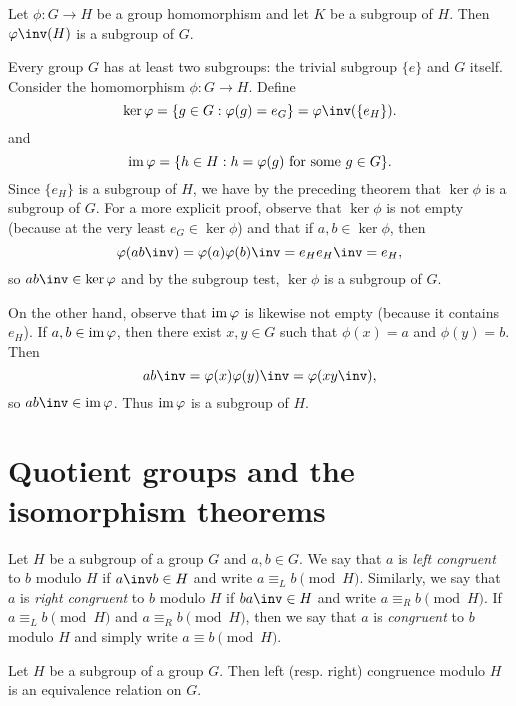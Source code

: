 \begin{theorem}
    Let \(\phi: G \to H\) be a group homomorphism and let \(K\) be a subgroup of
    \(H\). Then \(\phi\inv(H)\) is a subgroup of \(G\).
\end{theorem}


Every group \(G\) has at least two subgroups: the trivial subgroup \(\{e\}\) and
\(G\) itself. Consider the homomorphism \(\phi: G \to H\). Define
\[
    \ker \phi = \{g \in G : \phi(g) = e_G\} = \phi\inv(\{e_H\}).
\]
and
\[
    \operatorname{im} \varphi = \{h \in H : h = \varphi(g) \text{ for some } g \in G\}.
\]
Since \(\{e_H\}\) is a subgroup of \(H\), we have by the preceding theorem that
\(\ker \phi\) is a subgroup of \(G\). For a more explicit proof, observe that
\(\ker \phi\) is not empty (because at the very least \(e_G \in \ker \phi\)) and
that if \(a, b \in \ker \phi\), then 
\[
    \phi(ab\inv) = \phi(a)\phi(b)\inv = e_H e_H\inv = e_H,
\]
so \(ab\inv \in \ker \phi\) and by the subgroup test, \(\ker \phi\) is a
subgroup of \(G\).

On the other hand, observe that \(\operatorname{im} \varphi\) is likewise not empty (because it
contains \(e_H\)). If \(a, b \in \operatorname{im} \varphi\), then there exist \(x, y \in G\)
such that \(\phi(x) = a\) and \(\phi(y) = b\). Then
\[
    ab\inv = \phi(x)\phi(y)\inv = \phi(xy\inv),
\]
so \(ab\inv \in \img \phi\). Thus \(\operatorname{im} \varphi\) is a subgroup of \(H\).


\section{Quotient groups and the isomorphism theorems}

\begin{definition}
    Let \(H\) be a subgroup of a group \(G\) and \(a, b \in G\). We say that
    \(a\) is \emph{left congruent} to \(b\) modulo \(H\) if \(a\inv b \in H\)
    and write \(a \equiv_L b \pmod{H}\). Similarly, we say that \(a\) is
    \emph{right congruent} to \(b\) modulo \(H\) if \(ba\inv \in H\) and write
    \(a \equiv_R b \pmod{H}\). If \(a \equiv_L b \pmod{H}\) and \(a \equiv_R b
    \pmod{H}\), then we say that \(a\) is \emph{congruent} to \(b\) modulo \(H\)
    and simply write \(a \equiv b \pmod{H}\).
\end{definition}

\begin{theorem}
    Let \(H\) be a subgroup of a group \(G\). Then left (resp. right) congruence
    modulo \(H\) is an equivalence relation on \(G\).
\end{theorem}

